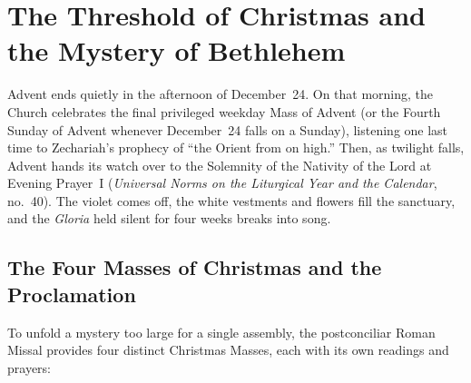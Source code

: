 \section{The Threshold of Christmas and the Mystery of Bethlehem}\label{sec:bethlehem}

Advent ends quietly in the afternoon of December~24. On that morning, the Church celebrates the final privileged weekday Mass of Advent (or the Fourth Sunday of Advent whenever December~24 falls on a Sunday), listening one last time to Zechariah's prophecy of ``the Orient from on high.'' Then, as twilight falls, Advent hands its watch over to the Solemnity of the Nativity of the Lord at Evening Prayer~I (\textit{Universal Norms on the Liturgical Year and the Calendar}, no.~40). The violet comes off, the white vestments and flowers fill the sanctuary, and the \textit{Gloria} held silent for four weeks breaks into song.

\subsection{The Four Masses of Christmas and the Proclamation}

To unfold a mystery too large for a single assembly, the postconciliar Roman Missal provides four distinct Christmas Masses, each with its own readings and prayers:

